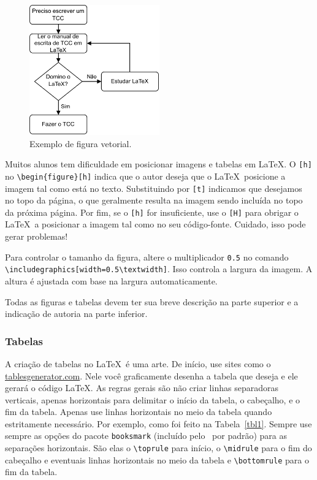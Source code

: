 \documentclass[
	article,			%
	12pt,				%
	oneside,			%
	a4paper,			%
	english,			%
	brazil,				%
	sumario=tradicional
]{abntex2}
\begin{document}
\begin{figure}[h]
	\centering
	\label{fig1}
	\caption{Exemplo de figura vetorial.}
	\includegraphics[width=0.5\textwidth]{figuras/diagrama-tcc-latex.pdf}
\end{figure}

Muitos alunos tem dificuldade em posicionar imagens e tabelas em \LaTeX. O \verb|[h]| no \verb|\begin{figure}[h]| indica que o autor deseja que o \LaTeX\ posicione a imagem tal como está no texto. Substituindo por \verb|[t]| indicamos que desejamos no topo da página, o que geralmente resulta na imagem sendo incluída no topo da próxima página. Por fim, se o \verb|[h]| for insuficiente, use o \verb|[H]| para obrigar o \LaTeX\ a posicionar a imagem tal como no seu código-fonte. Cuidado, isso pode gerar problemas!

Para controlar o tamanho da figura, altere o multiplicador \verb|0.5| no comando \verb|\includegraphics[width=0.5\textwidth]|. Isso controla a largura da imagem. A altura é ajustada com base na largura automaticamente.

Todas as figuras e tabelas devem ter sua breve descrição na parte superior e a indicação de autoria na parte inferior.

\subsubsection{Tabelas}

A criação de tabelas no \LaTeX\ é uma arte. De início, use sites como o \href{https://www.tablesgenerator.com/}{tablesgenerator.com}. Nele você graficamente desenha a tabela que deseja e ele gerará o código \LaTeX. As regras gerais são não criar linhas separadoras verticais, apenas horizontais para delimitar o início da tabela, o cabeçalho, e o fim da tabela. Apenas use linhas horizontais no meio da tabela quando estritamente necessário. Por exemplo, como foi feito na Tabela~\ref{tbl1}. Sempre use sempre as opções do pacote \verb|booksmark| (incluído pelo \abnTeX\ por padrão) para as separações horizontais. São elas o \verb|\toprule| para início, o \verb|\midrule| para o fim do cabeçalho e eventuais linhas horizontais no meio da tabela e \verb|\bottomrule| para o fim da tabela.
\end{document}
